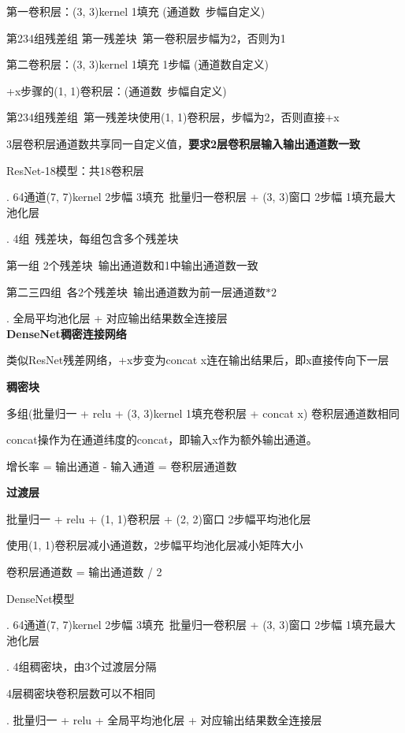 \documentclass[UTF8]{ctexart}
\begin{document}
  \quad \quad 第一卷积层：(3, 3)kernel 1填充 (通道数\ 步幅自定义)

  \quad \quad \quad 第234组残差组 第一残差块\ 第一卷积层步幅为2，否则为1

  \quad \quad 第二卷积层：(3, 3)kernel 1填充 1步幅 (通道数自定义)

  \quad \quad +x步骤的(1, 1)卷积层：(通道数\ 步幅自定义) 

  \quad \quad \quad 第234组残差组\ 第一残差块使用(1, 1)卷积层，步幅为2，否则直接+x

  \quad \quad 3层卷积层通道数共享同一自定义值，\textbf{要求2层卷积层输入输出通道数一致}

  ResNet-18模型：共18卷积层

  . 64通道(7, 7)kernel 2步幅 3填充\ 批量归一卷积层 + (3, 3)窗口 2步幅 1填充最大池化层

  . 4组\ 残差块，每组包含多个残差块

  \quad \quad 第一组 2个残差块\ 输出通道数和1中输出通道数一致
  
  \quad \quad 第二三四组\ 各2个残差块\ 输出通道数为前一层通道数$*2$

  . 全局平均池化层 + 对应输出结果数全连接层\\
\textbf{DenseNet稠密连接网络}

  类似ResNet残差网络，+x步变为concat x连在输出结果后，即x直接传向下一层

  \textbf{稠密块}

  \quad 多组(批量归一 + relu + (3, 3)kernel 1填充卷积层 + concat x) 卷积层通道数相同

  \quad concat操作为在通道纬度的concat，即输入x作为额外输出通道。

  \quad 增长率 = 输出通道 - 输入通道 = 卷积层通道数

  \textbf{过渡层}

  \quad 批量归一 + relu + (1, 1)卷积层 + (2, 2)窗口 2步幅平均池化层
  
  \quad 使用(1, 1)卷积层减小通道数，2步幅平均池化层减小矩阵大小

  \quad \quad 卷积层通道数 = 输出通道数 / 2

  DenseNet模型

  . 64通道(7, 7)kernel 2步幅 3填充\ 批量归一卷积层 + (3, 3)窗口 2步幅 1填充最大池化层

  . 4组稠密块，由3个过渡层分隔

  \quad \quad 4层稠密块卷积层数可以不相同

  . 批量归一 + relu + 全局平均池化层 + 对应输出结果数全连接层
\end{document}

